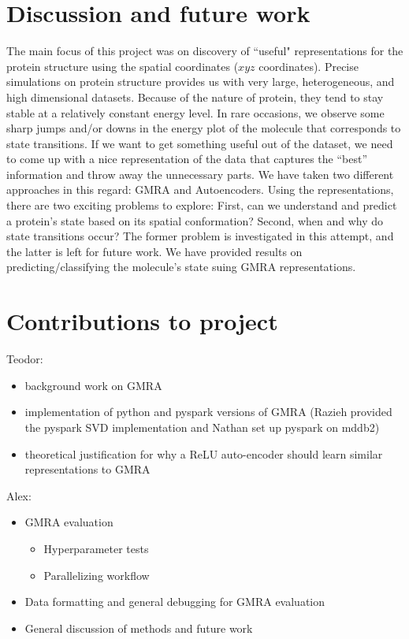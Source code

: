 \documentclass{article}
\begin{document}
\section{Discussion and future work}
The main focus of this project was on discovery of ``useful" representations for the protein structure using the spatial coordinates ($xyz$ coordinates). Precise simulations on protein structure provides us with very large, heterogeneous, and high dimensional datasets. Because of the nature of protein, they tend to stay stable at a relatively constant energy level. In rare occasions, we observe some sharp jumps and/or downs in the energy plot of the molecule that corresponds to state transitions. If we want to get something useful out of the dataset, we need to come up with a nice representation of the data that captures the ``best'' information and throw away the unnecessary parts. We have taken two different approaches in this regard: GMRA and Autoencoders. Using the representations, there are two exciting problems to explore: First, can we understand and predict a protein's state based on its spatial conformation? Second, when and why do state transitions occur? The former problem is investigated in this attempt, and the latter is left for future work. We have provided results on predicting/classifying the molecule's state suing GMRA representations. 

\section{Contributions to project}
Teodor:
\begin{itemize}
\item background work on GMRA
\item implementation of python and pyspark versions of GMRA (Razieh provided the pyspark SVD implementation and Nathan set up pyspark on mddb2)
\item theoretical justification for why a ReLU auto-encoder should learn similar representations to GMRA
\end{itemize}

Alex:
\begin{itemize}
	\item GMRA evaluation
	\begin{itemize}
		\item Hyperparameter tests
		\item Parallelizing workflow
	\end{itemize}
	\item Data formatting and general debugging for GMRA evaluation
	\item General discussion of methods and future work
\end{itemize}
\end{document}
